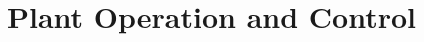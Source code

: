 \chapter{Plant Operation and Control}
\label{sec:operation-control}

\begin{refsection}

\localtableofcontents
\newpage








\clearpage
\printbibliography[heading=subbibintoc]

\begin{subappendices}
    
\end{subappendices}

\end{refsection}